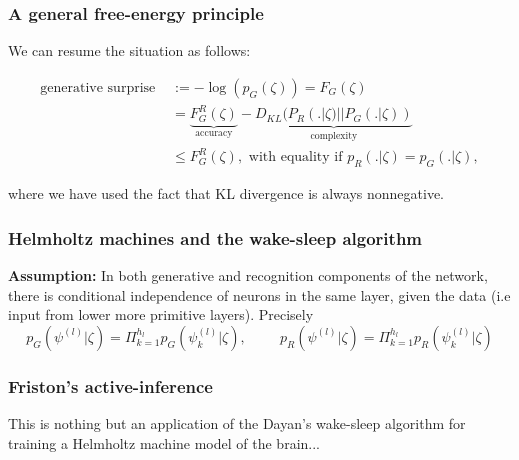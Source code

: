 \documentclass{article} %
\newtheorem{theorem}{Theorem} \newtheorem{lemma}[theorem]{Lemma}
\begin{document}
\subsubsection{A general free-energy principle}
We can resume the situation as follows:
\begin{mdframed}
\begin{equation}
  \begin{split}
    \text{generative surprise } &:= -\log(p_G(\zeta)) = F_G(\zeta) \\
    &=\underbrace{F^R_G(\zeta)}_{\text{accuracy}} - \underbrace{D_{KL}(P_R(.|\zeta) || P_G(.|\zeta))}_{\text{complexity}} \\
    &\le F^R_G(\zeta),
    \text{ with equality if }p_R(.|\zeta) = p_G(.|\zeta),
    \end{split}
\end{equation}
\end{mdframed}
where we have used the fact that KL divergence is always nonnegative.

\subsubsection{Helmholtz machines and the wake-sleep algorithm}
  \textbf{Assumption:} In both generative and recognition components of the network, there is conditional independence of  neurons in the same layer, given the data (i.e input from lower more primitive layers). Precisely
$$
p_G(\psi^{(l)}|\zeta) = \Pi_{k=1}^{h_l}p_G(\psi_k^{(l)} | \zeta),\hspace{1cm}
p_R(\psi^{(l)}|\zeta) = \Pi_{k=1}^{h_l}p_R(\psi_k^{(l)} |\zeta)
$$

\subsubsection{Friston's active-inference}
This is nothing but an application of the Dayan's wake-sleep algorithm for training a Helmholtz machine model of the brain...
\end{document}
